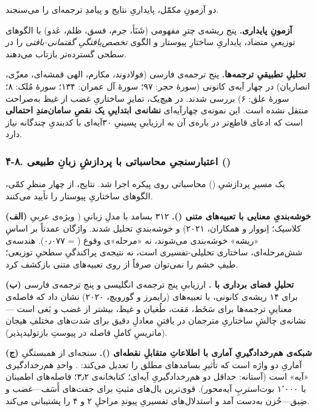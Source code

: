 \documentclass[12pt,a4paper]{article}
\begin{document}
\begin{RTL}
\begin{otherlanguage}{persian}
دو آزمونِ مکمّل، پایداریِ نتایج و پیامدِ ترجمه‌ای را می‌سنجند.

\textbf{آزمونِ پایداری.} پنج ریشه‌ی چترِ مفهومی (شَنَأ، جرم، فسق، ظلم، عَدو)
با الگوهای توزیعیِ متضاد، پایداریِ ساختارِ پیوستار و الگوی \emph{تخصص‌یافتگیِ
گفتمانی-بافتی} را در سطحی گسترده‌تر بازتاب می‌دهند.

\textbf{تحلیلِ تطبیقیِ ترجمه‌ها.} پنج ترجمه‌ی فارسی (فولادوند، مکارم، الهی
قمشه‌ای، معزّی، انصاریان) در چهار آیه‌ی کانونی (سورۀ حجر: ۹۷؛ سورۀ آل
عمران: ۱۳۴؛ سورۀ مُلک: ۸؛ سورۀ علق: ۶) بررسی شدند. در هیچ‌یک، تمایزِ
ساختاریِ غضب از غیظ به‌صراحت منتقل نشده است. این نمونه‌ی چهارآیه‌ای
\textbf{نشانه‌ی ابتداییِ یک نقصِ سامان‌مندِ احتمالی} است که ادعای قاطع‌تر در
باره‌ی آن به ارزیابیِ پسینیِ ۳۰‌آیه‌ای با کدبندیِ چندگانه نیاز دارد.

\subsubsection{\texorpdfstring{۴-۸. اعتبارسنجیِ محاسباتی با پردازشِ زبانِ
طبیعی
()}{۴-۸. اعتبارسنجیِ محاسباتی با پردازشِ زبانِ طبیعی ()}}\label{ux627ux639ux62aux628ux627ux631ux633ux646ux62cux6cc-ux645ux62dux627ux633ux628ux627ux62aux6cc-ux628ux627-ux67eux631ux62fux627ux632ux634-ux632ux628ux627ux646-ux637ux628ux6ccux639ux6cc}

یک مسیرِ پردازشیِ () محاسباتی روی پیکره اجرا شد. نتایج، از
چهار منظرِ کمّی، الگوهای ساختاریِ پیوستار را تأیید می‌کنند.

\textbf{(الف) خوشه‌بندیِ معنایی با تعبیه‌های متنی ().}
۳۱۲ بسامد با مدلِ زبانیِ  ( ویژه‌ی عربیِ کلاسیک؛
اِنووار و همکاران، ۲۰۲۱) و خوشه‌بندیِ  تحلیل شدند. واژگان عمدتاً
بر اساسِ «ریشه» خوشه‌بندی می‌شوند، نه «مرحله»‌ی وقوع ( = ۰٫۰۷۷).
هندسه‌ی شش‌مرحله‌ای، ساختاری تحلیلی-تفسیری است، نه نتیجه‌ی پراکندگیِ سطحیِ
توزیعی؛ طیفِ خشم را نمی‌توان صرفاً از روی تعبیه‌های متنی بازکشف کرد.

\textbf{(ب) تحلیلِ فضای برداری با .} ارزیابیِ پنج ترجمه‌ی انگلیسی
و پنج ترجمه‌ی فارسی برای ۱۴ ریشه‌ی کانونی، با تعبیه‌های
 (رایمرز و گورویچ، ۲۰۲۰) نشان
داد که فاصله‌ی معناییِ ترجمه‌ها برای سَخَط، مَقت، طُغیان و غیظ، بیشتر از غضب و
بَغی است --- نشانه‌ی چالشِ ساختاریِ مترجمان در یافتنِ معادلِ دقیق برای شدت‌های
مختلفِ هیجان (ماتریسِ کاملِ فاصله در پیوستِ بازتولیدپذیر).

\textbf{(ج) شبکه‌ی هم‌رخدادگیریِ آماری با اطلاعاتِ متقابلِ نقطه‌ای
().}  سنجه‌ای از همبستگیِ آماریِ دو واژه است که تأثیرِ
بسامدهای مطلق را تعدیل می‌کند: .
واحدِ هم‌رخدادگیری «آیه» است (آستانه: حداقل دو هم‌رخدادگیریِ آیه‌ای؛
کتابخانه‌ی  ۳٫۲؛ فاصله‌های اطمینان با ۱٬۰۰۰ بوت‌استرپِ
آیه‌محور). قوی‌ترین یال‌های مثبتِ  برای جفت‌های أَسَف---غضب و ضِیق---حُزن
به‌دست آمد و استدلال‌های تفسیریِ پیوندِ مراحلِ ۲ و ۴ را پشتیبانی می‌کند.


\end{otherlanguage}
\end{RTL}
\end{document}
